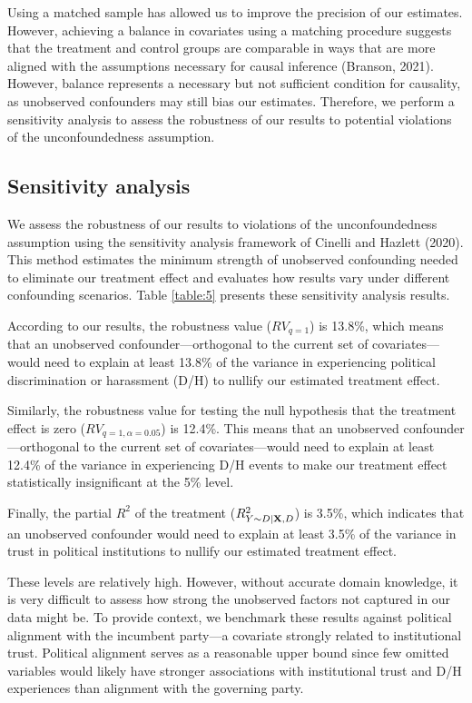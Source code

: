 \documentclass{article}
\begin{document}
Using a matched sample has allowed us to improve the precision of our estimates. However, achieving a balance in covariates using a matching procedure suggests that the treatment and control groups are comparable in ways that are more aligned with the assumptions necessary for causal inference (Branson, 2021). However, balance represents a necessary but not sufficient condition for causality, as unobserved confounders may still bias our estimates. Therefore, we perform a sensitivity analysis to assess the robustness of our results to potential violations of the unconfoundedness assumption.

\subsection{Sensitivity analysis}

We assess the robustness of our results to violations of the unconfoundedness assumption using the sensitivity analysis framework of Cinelli and Hazlett (2020). This method estimates the minimum strength of unobserved confounding needed to eliminate our treatment effect and evaluates how results vary under different confounding scenarios. Table \ref{table:5} presents these sensitivity analysis results.

According to our results, the robustness value ($RV_{q = 1}$) is 13.8\%, which means that an unobserved confounder—orthogonal to the current set of covariates—would need to explain at least 13.8\% of the variance in experiencing political discrimination or harassment (D/H) to nullify our estimated treatment effect.

Similarly, the robustness value for testing the null hypothesis that the treatment effect is zero ($RV_{q = 1, \alpha = 0.05}$) is 12.4\%. This means that an unobserved confounder—orthogonal to the current set of covariates—would need to explain at least 12.4\% of the variance in experiencing D/H events to make our treatment effect statistically insignificant at the 5\% level.

Finally, the partial $R^2$ of the treatment ($R^2_{Y\sim D| {\bf X}, D}$) is 3.5\%, which indicates that an unobserved confounder would need to explain at least 3.5\% of the variance in trust in political institutions to nullify our estimated treatment effect.

These levels are relatively high. However, without accurate domain knowledge, it is very difficult to assess how strong the unobserved factors not captured in our data might be. To provide context, we benchmark these results against political alignment with the incumbent party—a covariate strongly related to institutional trust. Political alignment serves as a reasonable upper bound since few omitted variables would likely have stronger associations with institutional trust and D/H experiences than alignment with the governing party.
\end{document}
